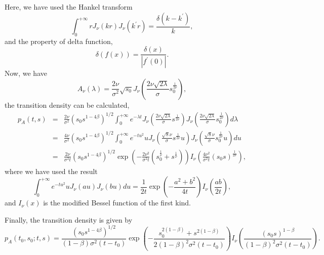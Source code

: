 \documentclass[12pt]{article}
\begin{document}
  Here, we have used the Hankel transform
  \begin{equation}
    \int_0^{+\infty}rJ_{\nu}(kr)J_{\nu}(k^{\prime}r)=\frac{\delta(k-k^{\prime})}{k},
  \end{equation}
  and the property of delta function,
  \begin{equation}
    \delta\left(f(x)\right)=\frac{\delta(x)}{|f^{\prime}(0)|}.
  \end{equation}
  Now, we have
  $$
    A_{\nu}(\lambda)=\frac{2\nu}{\sigma^2}\sqrt{s_0}J_{\nu}\left(\frac{2\nu\sqrt{2\lambda}}{\sigma}s_0^{\frac{1}{2\nu}}\right),
  $$
  the transition density can be calculated,
  \begin{eqnarray}
    p_A(t,s) &=& \frac{2\nu}{\sigma^2}\left(s_0s^{1-4\beta}\right)^{1/2}\int_0^{+\infty}e^{-\lambda t}
                J_{\nu}\left(\frac{2\nu\sqrt{2\lambda}}{\sigma}s^{\frac{1}{2\nu}}\right)
                J_{\nu}\left(\frac{2\nu\sqrt{2\lambda}}{\sigma}s_0^{\frac{1}{2\nu}}\right)d\lambda\nonumber\\
           &=& \frac{4\nu}{\sigma^2}\left(s_0s^{1-4\beta}\right)^{1/2}\int_0^{+\infty}e^{-tu^2} u
                J_{\nu}\left(\frac{\sqrt{8}\nu}{\sigma}s^{\frac{1}{2\nu}}u\right)
                J_{\nu}\left(\frac{\sqrt{8}\nu}{\sigma}s_0^{\frac{1}{2\nu}}u\right)du\nonumber\\
           &=& \frac{2\nu}{\sigma^2t}\left(s_0s^{1-4\beta}\right)^{1/2}
               \exp\left(-\frac{2\nu^2}{\sigma^2t}\left(s_0^{\frac{1}{\nu}}+s^{\frac{1}{\nu}}\right)\right)
               I_{\nu}\left(\frac{4\nu^2}{\sigma^2t}\left(s_0s\right)^{\frac{1}{2\nu}}\right),
  \end{eqnarray}
  where we have used the result \cite{DLMF1}
  \begin{equation}
    \int_0^{+\infty}e^{-tu^2}uJ_{\nu}(au)J_{\nu}(bu)du=\frac{1}{2t}\exp\left(-\frac{a^2+b^2}{4t}\right)I_{\nu}\left(\frac{ab}{2t}\right),
  \end{equation}
  and $I_{\nu}(x)$ is the modified Bessel function of the first kind.

  Finally, the transition density is given by
  \begin{equation}
    p_A(t_0,s_0;t,s)=\frac{\left(s_0s^{1-4\beta}\right)^{1/2}}{(1-\beta)\sigma^2(t-t_0)}
    \exp\left(-\frac{s_0^{2(1-\beta)}+s^{2(1-\beta)}}{2(1-\beta)^2\sigma^2(t-t_0)}\right)
    I_{\nu}\left(\frac{\left(s_0s\right)^{1-\beta}}{(1-\beta)^2\sigma^2(t-t_0)}\right).
    \label{density1}
  \end{equation}
\end{document}
